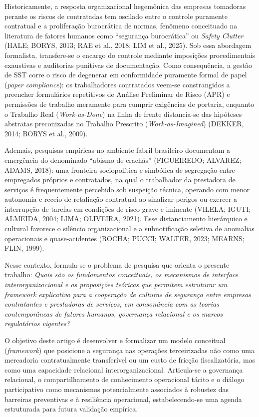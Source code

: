 \documentclass[12pt,a4paper]{article}
\begin{document}
Historicamente, a resposta organizacional hegemônica das empresas tomadoras perante os riscos de contratadas tem oscilado entre o controle puramente contratual e a proliferação burocrática de normas, fenômeno conceituado na literatura de fatores humanos como ``segurança burocrática'' ou \textit{Safety Clutter} (HALE; BORYS, 2013; RAE et al., 2018; LIM et al., 2025). Sob essa abordagem formalista, transfere-se o encargo do controle mediante imposições procedimentais exaustivas e auditorias punitivas de documentação. Como consequência, a gestão de SST corre o risco de degenerar em conformidade puramente formal de papel (\textit{paper compliance}): os trabalhadores contratados veem-se constrangidos a preencher formulários repetitivos de Análise Preliminar de Risco (APR) e permissões de trabalho meramente para cumprir exigências de portaria, enquanto o Trabalho Real (\textit{Work-as-Done}) na linha de frente distancia-se das hipóteses abstratas preconizadas no Trabalho Prescrito (\textit{Work-as-Imagined}) (DEKKER, 2014; BORYS et al., 2009).

Ademais, pesquisas empíricas no ambiente fabril brasileiro documentam a emergência do denominado ``abismo de crachás'' (FIGUEIREDO; ALVAREZ; ADAMS, 2018): uma fronteira sociopolítica e simbólica de segregação entre empregados próprios e contratados, na qual o trabalhador da prestadora de serviços é frequentemente percebido sob suspeição técnica, operando com menor autonomia e receio de retaliação contratual ao sinalizar perigos ou exercer a interrupção de tarefas em condições de risco grave e iminente (VILELA; IGUTI; ALMEIDA, 2004; LIMA; OLIVEIRA, 2021). Esse distanciamento hierárquico e cultural favorece o silêncio organizacional e a subnotificação seletiva de anomalias operacionais e quase-acidentes (ROCHA; PUCCI; WALTER, 2023; MEARNS; FLIN, 1999).

Nesse contexto, formula-se o problema de pesquisa que orienta o presente trabalho: \textit{Quais são os fundamentos conceituais, os mecanismos de interface interorganizacional e as proposições teóricas que permitem estruturar um framework explicativo para a cooperação de culturas de segurança entre empresas contratantes e prestadoras de serviços, em consonância com as teorias contemporâneas de fatores humanos, governança relacional e os marcos regulatórios vigentes?}

O objetivo deste artigo é desenvolver e formalizar um modelo conceitual (\textit{framework}) que posicione a segurança nas operações terceirizadas não como uma mercadoria contratualmente transferível ou um custo de fricção fiscalizatória, mas como uma capacidade relacional interorganizacional. Articula-se a governança relacional, o compartilhamento de conhecimento operacional tácito e o diálogo participativo como mecanismos potencialmente associados à robustez das barreiras preventivas e à resiliência operacional, estabelecendo-se uma agenda estruturada para futura validação empírica.
\end{document}
